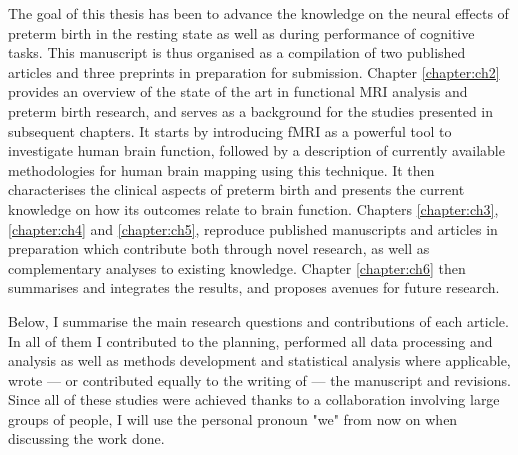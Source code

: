 The goal of this thesis has been to advance the knowledge on the neural effects of preterm birth in the resting state as well as during performance of cognitive tasks. This manuscript is thus organised as a compilation of two published articles and three preprints in preparation for submission. 
Chapter \ref{chapter:ch2} provides an overview of the state of the art in functional MRI analysis and preterm birth research, and serves as a background for the studies presented in subsequent chapters. 
It starts by introducing fMRI as a powerful tool to investigate human brain function, followed by a description of currently available methodologies for human brain mapping using this technique. 
It then characterises the clinical aspects of preterm birth and presents the current knowledge on how its outcomes relate to brain function.
Chapters \ref{chapter:ch3}, \ref{chapter:ch4} and \ref{chapter:ch5}, reproduce published manuscripts and articles in preparation which contribute both through novel research, as well as complementary analyses to existing knowledge.  
Chapter \ref{chapter:ch6} then summarises and integrates the results, and proposes avenues for future research. 

Below, I summarise the main research questions and contributions of each article. 
In all of them I contributed to the planning, performed all data processing and analysis as well as methods development and statistical analysis where applicable, wrote --- or contributed equally to the writing of --- the manuscript and revisions. 
Since all of these studies were achieved thanks to a collaboration involving large groups of people, I will use the personal pronoun "we" from now on when discussing the work done. 



